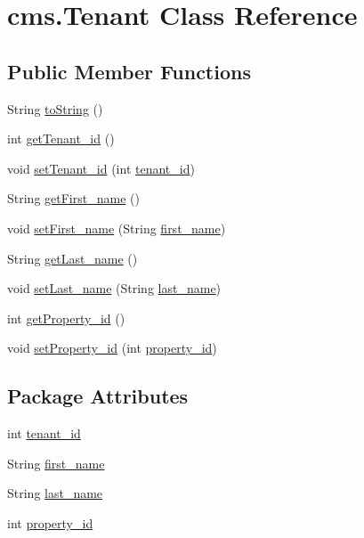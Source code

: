 \hypertarget{classcms_1_1_tenant}{}\section{cms.\+Tenant Class Reference}
\label{classcms_1_1_tenant}
\subsection*{Public Member Functions}
\begin{DoxyCompactItemize}
\item 
String \mbox{\hyperlink{classcms_1_1_tenant_a67c8a09ed8d9f3d6778485449d80c9cd}{to\+String}} ()
\item 
int \mbox{\hyperlink{classcms_1_1_tenant_a46db762af1b16b09ecdef6d269cbc082}{get\+Tenant\+\_\+id}} ()
\item 
void \mbox{\hyperlink{classcms_1_1_tenant_ad701e450f795e42cc270b1fd493ac01f}{set\+Tenant\+\_\+id}} (int \mbox{\hyperlink{classcms_1_1_tenant_a9f6959947f8d1b98471e00b7952f956e}{tenant\+\_\+id}})
\item 
String \mbox{\hyperlink{classcms_1_1_tenant_a8943f72cc08bc00df16f2853c511a119}{get\+First\+\_\+name}} ()
\item 
void \mbox{\hyperlink{classcms_1_1_tenant_ab27056aae28594e19b2c0ec12fbdcebe}{set\+First\+\_\+name}} (String \mbox{\hyperlink{classcms_1_1_tenant_adba73a34c1f9da8843218c5eb247bf65}{first\+\_\+name}})
\item 
String \mbox{\hyperlink{classcms_1_1_tenant_aad46ca5732d9f16cd5f84080e152ef97}{get\+Last\+\_\+name}} ()
\item 
void \mbox{\hyperlink{classcms_1_1_tenant_ae0280b9a9edb5aceff758916b5239c6a}{set\+Last\+\_\+name}} (String \mbox{\hyperlink{classcms_1_1_tenant_a1f1a39984c6ad7060da79bd6a3ab91ef}{last\+\_\+name}})
\item 
int \mbox{\hyperlink{classcms_1_1_tenant_ab01874700cb95a5b7c26613a83edc3fd}{get\+Property\+\_\+id}} ()
\item 
void \mbox{\hyperlink{classcms_1_1_tenant_ac82f6fd8f7c8537b10b1b6b4a96b5c43}{set\+Property\+\_\+id}} (int \mbox{\hyperlink{classcms_1_1_tenant_a4954483dd78e87b6b4d5e5dac444971e}{property\+\_\+id}})
\end{DoxyCompactItemize}
\subsection*{Package Attributes}
\begin{DoxyCompactItemize}
\item 
int \mbox{\hyperlink{classcms_1_1_tenant_a9f6959947f8d1b98471e00b7952f956e}{tenant\+\_\+id}}
\item 
String \mbox{\hyperlink{classcms_1_1_tenant_adba73a34c1f9da8843218c5eb247bf65}{first\+\_\+name}}
\item 
String \mbox{\hyperlink{classcms_1_1_tenant_a1f1a39984c6ad7060da79bd6a3ab91ef}{last\+\_\+name}}
\item 
int \mbox{\hyperlink{classcms_1_1_tenant_a4954483dd78e87b6b4d5e5dac444971e}{property\+\_\+id}}
\end{DoxyCompactItemize}


